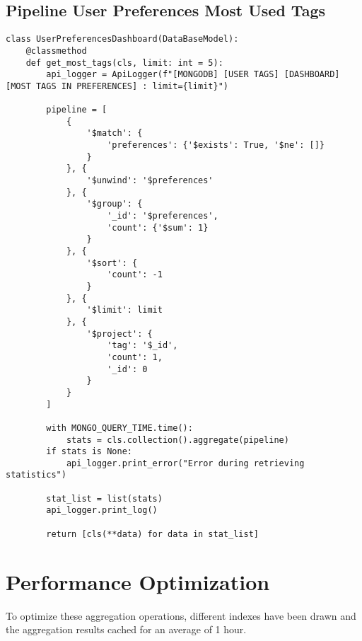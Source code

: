 \subsection{Pipeline User Preferences Most Used Tags}\label{subsec:pipeline-user-preferences-most-used-tags}

\begin{lstlisting}[style=pythonstyle,label={lst:pipeline-user-preferences-most-used-tags},caption={Pipeline User Preferences Most Used Tags}]
class UserPreferencesDashboard(DataBaseModel):
    @classmethod
    def get_most_tags(cls, limit: int = 5):
        api_logger = ApiLogger(f"[MONGODB] [USER TAGS] [DASHBOARD] [MOST TAGS IN PREFERENCES] : limit={limit}")

        pipeline = [
            {
                '$match': {
                    'preferences': {'$exists': True, '$ne': []}
                }
            }, {
                '$unwind': '$preferences'
            }, {
                '$group': {
                    '_id': '$preferences',
                    'count': {'$sum': 1}
                }
            }, {
                '$sort': {
                    'count': -1
                }
            }, {
                '$limit': limit
            }, {
                '$project': {
                    'tag': '$_id',
                    'count': 1,
                    '_id': 0
                }
            }
        ]

        with MONGO_QUERY_TIME.time():
            stats = cls.collection().aggregate(pipeline)
        if stats is None:
            api_logger.print_error("Error during retrieving statistics")

        stat_list = list(stats)
        api_logger.print_log()

        return [cls(**data) for data in stat_list]
\end{lstlisting}


\section{Performance Optimization}\label{sec:performance-optimization}

To optimize these aggregation operations, different indexes have been drawn and the aggregation results cached for an average of 1 hour.


